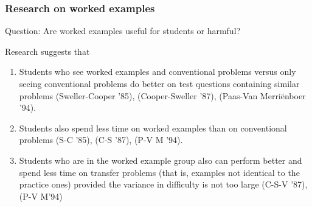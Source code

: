 \documentclass{beamer}
\begin{document}
\frame
{
  \frametitle{\bf{Research on worked examples}}

\alert{Question:} Are worked examples useful for students or harmful?

\medskip

Research suggests that
            \begin{enumerate}
            \item Students who see worked examples and conventional problems versus only seeing conventional problems do better on test questions containing similar problems (Sweller-Cooper '85), (Cooper-Sweller '87), (Paas-Van Merri\"enboer '94).
            \item Students also spend less time on worked examples than on conventional problems (S-C '85), (C-S '87), (P-V M '94).
            \item Students who are in the worked example group also can perform better and spend less time on transfer problems (that is, examples not identical to the practice ones) provided the variance in difficulty is not too large (C-S-V  '87), (P-V M'94)
            \end{enumerate}
}




\end{document}
